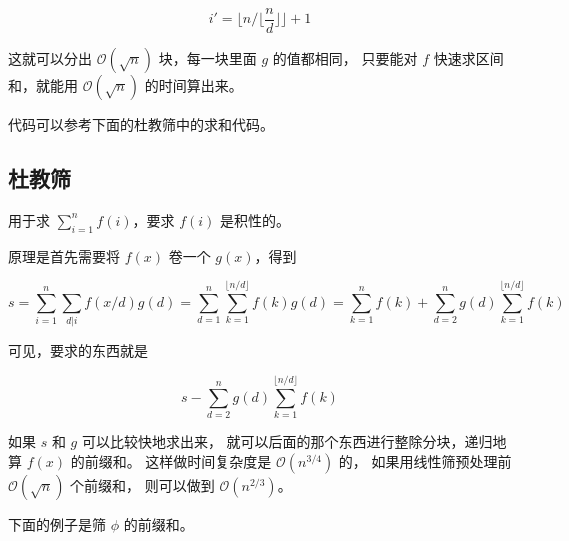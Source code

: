 $$i' = \lfloor n / \lfloor \frac{n}{d} \rfloor \rfloor + 1$$

这就可以分出 $\mathcal{O}(\sqrt{n})$ 块，每一块里面 $g$ 的值都相同，
只要能对 $f$ 快速求区间和，就能用 $\mathcal{O}(\sqrt{n})$ 的时间算出来。

代码可以参考下面的杜教筛中的求和代码。

\subsection{杜教筛}

用于求 $\sum_{i=1}^n f(i)$，要求 $f(i)$ 是积性的。

原理是首先需要将 $f(x)$ 卷一个 $g(x)$，得到

$$s = \sum_{i=1}^n \sum_{d|i} f(x/d) g(d) =
\sum_{d=1}^n \sum_{k=1}^{\lfloor n/d \rfloor} f(k) g(d) =
\sum_{k=1}^n f(k) + \sum_{d=2}^n g(d) \sum_{k=1}^{\lfloor n/d \rfloor}f(k)$$

可见，要求的东西就是

$$s - \sum_{d=2}^n g(d) \sum_{k=1}^{\lfloor n/d \rfloor} f(k)$$

如果 $s$ 和 $g$ 可以比较快地求出来，
就可以后面的那个东西进行整除分块，递归地算 $f(x)$ 的前缀和。
这样做时间复杂度是 $\mathcal{O}(n^{3/4})$ 的，
如果用线性筛预处理前 $\mathcal{O}(\sqrt{n})$ 个前缀和，
则可以做到 $\mathcal{O}(n^{2/3})$。

下面的例子是筛 $\phi$ 的前缀和。


